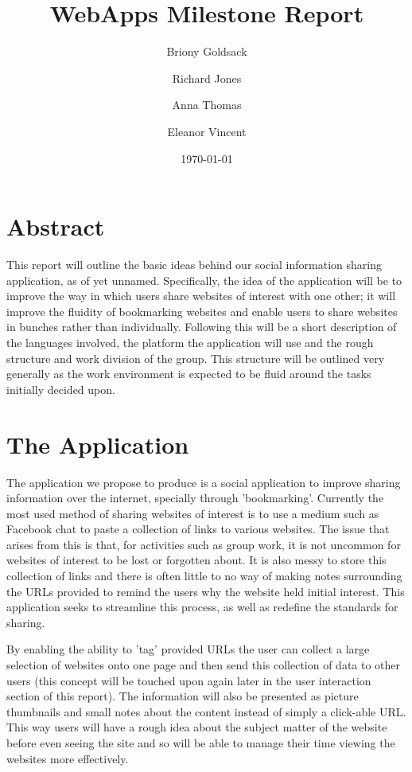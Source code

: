 \documentclass[a4wide, 10pt]{article}
\begin{document}
\title{WebApps Milestone Report}
\author{Briony Goldsack \and Richard Jones \and Anna Thomas \and Eleanor Vincent}
\date{\today}         
\maketitle            

\section{Abstract}

This report will outline the basic ideas behind our social information sharing application, as of yet unnamed. Specifically, the idea of the application will be to improve the way in which users share websites of interest with one other; it will improve the fluidity of bookmarking websites and enable users to share websites in bunches rather than individually. Following this will be a short description of the languages involved, the platform the application will use and the rough structure and work division of the group. This structure will be outlined very generally as the work environment is expected to be fluid around the tasks initially decided upon.

\section{The Application}

The application we propose to produce is a social application to improve sharing information over the internet, specially through 'bookmarking'. Currently the most used method of sharing websites of interest is to use a medium such as Facebook chat to paste a collection of links to various websites. The issue that arises from this is that, for activities such as group work, it is not uncommon for websites of interest to be lost or forgotten about. It is also messy to store this collection of links and there is often little to no way of making notes surrounding the URLs provided to remind the users why the website held initial interest. This application seeks to streamline this process, as well as redefine the standards for sharing. 

By enabling the ability to 'tag' provided URLs the user can collect a large selection of websites onto one page and then send this collection of data to other users (this concept will be touched upon again later in the user interaction section of this report). The information will also be presented as picture thumbnails and small notes about the content instead of simply a click-able URL. This way users will have a rough idea about the subject matter of the website before even seeing the site and so will be able to manage their time viewing the websites more effectively. 
\end{document}

